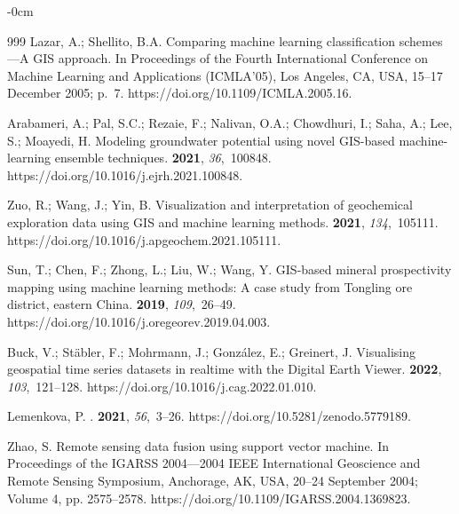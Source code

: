 \documentclass[data,article,accept,pdftex,moreauthors]{Definitions/mdpi}
\begin{document}
{\begin{adjustwidth}{-\extralength}{0cm}
\begin{thebibliography}{999}
Lazar, A.; Shellito, B.A.
\newblock Comparing machine learning classification schemes---A GIS approach.
\newblock In Proceedings of the Fourth International Conference on Machine
 Learning and Applications (ICMLA'05), Los Angeles, CA, USA, 15--17 December 2005; p.~7. https://doi.org/10.1109/ICMLA.2005.16. 

Arabameri, A.; Pal, S.C.; Rezaie, F.; Nalivan, O.A.; Chowdhuri, I.; Saha, A.;
 Lee, S.; Moayedi, H.
\newblock Modeling groundwater potential using novel GIS-based machine-learning
 ensemble techniques.
 {\bf 2021}, {\em
 36},~100848.
https://doi.org/10.1016/j.ejrh.2021.100848.

Zuo, R.; Wang, J.; Yin, B.
\newblock Visualization and interpretation of geochemical exploration data
 using GIS and machine learning methods.
 {\bf 2021}, {\em 134},~105111.
https://doi.org/10.1016/j.apgeochem.2021.105111.

Sun, T.; Chen, F.; Zhong, L.; Liu, W.; Wang, Y.
\newblock GIS-based mineral prospectivity mapping using machine learning
 methods: A case study from Tongling ore district, eastern China.
 {\bf 2019}, {\em 109},~26--49.
https://doi.org/10.1016/j.oregeorev.2019.04.003.

Buck, V.; Stäbler, F.; Mohrmann, J.; González, E.; Greinert, J.
\newblock Visualising geospatial time series datasets in realtime with the
 Digital Earth Viewer.
 {\bf 2022}, {\em 103},~121--128.
https://doi.org/10.1016/j.cag.2022.01.010.

Lemenkova, P.
.
 {\bf 2021}, {\em 56},~3--26.
https://doi.org/10.5281/zenodo.5779189.

Zhao, S.
\newblock Remote sensing data fusion using support vector machine.
\newblock In Proceedings %
 of the IGARSS 2004---2004 IEEE International Geoscience and Remote Sensing Symposium, Anchorage, AK, USA, 20--24 September 2004; Volume 4, pp. 2575--2578. https://doi.org/10.1109/IGARSS.2004.1369823.


\end{thebibliography}
\end{adjustwidth}}
\end{document}
